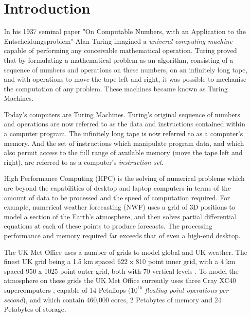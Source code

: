 \section{Introduction}

In his 1937 seminal paper "On Computable Numbers, with an Application to the Entscheidungsproblem" \cite{turing} Alan Turing imagined a \emph{univeral computing machine} capable of performing any conceivable mathematical operation. Turing proved that by formulating a mathematical problem as an algorithm, consisting of a sequence of numbers and operations on these numbers, on an infinitely long tape, and with operations to move the tape left and right, it was possible to mechanise the computation of any problem. These machines became known as Turing Machines. 

Today's computers are Turing Machines. Turing's original sequence of numbers and operations are now referred to as the data and  instructions contained within a computer program. The infinitely long tape is now referred to as a computer's memory. And the set of instructions which manipulate program data, and which also permit access to the full range of available memory (move the tape left and right), are referred to as a computer's \emph{instruction set}.

High Performance Computing (HPC) is the solving of numerical problems which are beyond the capabilities of desktop and laptop computers in terms of the amount of data to be processed and the speed of computation required. For example, numerical weather forecasting (NWF) uses a grid of 3D positions to model a section of the Earth's atmosphere, and then solves partial differential equations at each of these points to produce forecasts. The processing performance and memory required far exceeds that of even a high-end desktop. 

The UK Met Office uses a number of grids to model global and UK weather. The finest UK grid being a 1.5 km spaced 622 x 810 point inner grid, with a 4 km spaced 950 x 1025 point outer grid, both with 70 vertical levels \cite{metoffice-grids}. To model the atmosphere on these grids the UK Met Office currently uses three Cray XC40 supercomputers \cite{metoffice-cray}, capable of 14 Petaflops ($10^{15}$ \emph{floating point operations per second}), and which contain 460,000 cores, 2 Petabytes of memory and 24 Petabytes of storage.

